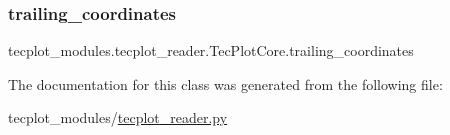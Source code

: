 \hypertarget{a00118_ab6edfe4cfa33db98eb1414228f78a303}{}\label{a00118_ab6edfe4cfa33db98eb1414228f78a303} 
\subsubsection{\texorpdfstring{trailing\+\_\+coordinates}{trailing\_coordinates}}
{\footnotesize\ttfamily tecplot\+\_\+modules.\+tecplot\+\_\+reader.\+Tec\+Plot\+Core.\+trailing\+\_\+coordinates}



The documentation for this class was generated from the following file\+:\begin{DoxyCompactItemize}
\item 
tecplot\+\_\+modules/\hyperlink{a00041}{tecplot\+\_\+reader.\+py}\end{DoxyCompactItemize}
